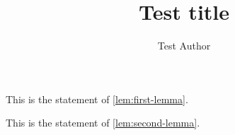 \documentclass[autoref]{lipics-v2019}
\title{Test title}
\author{Test Author}{Test Affiliation}{}{}{}
\begin{document}
\maketitle

\begin{lemma}\label{lem:first-lemma}
  This is the statement of \autoref{lem:first-lemma}.
\end{lemma}
\begin{lemma}\label{lem:second-lemma}
  This is the statement of \autoref{lem:second-lemma}.
\end{lemma}
\end{document}
